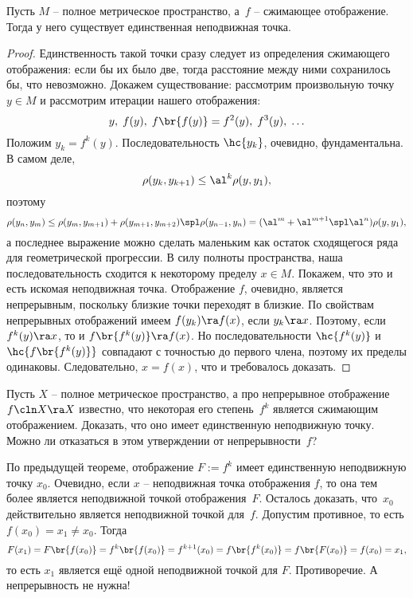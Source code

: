 \documentclass[a4paper]{article}
\begin{document}
\begin{theorem}
Пусть $M$ -- полное метрическое пространство, а~$f$ -- сжимающее отображение.
Тогда у него существует единственная неподвижная точка.
\end{theorem}
\begin{proof}
Единственность такой точки сразу следует из определения сжимающего отображения: если бы их было две,
тогда расстояние между ними сохранилось бы, что невозможно. Докажем существование:
рассмотрим произвольную точку $y \in M$ и рассмотрим итерации нашего отображения:
$$y,\; f(y),\;  f\br{f(y)} = f^2(y),\;  f^3(y),\;  \ldots$$
Положим $y_k = f^k(y)$. Последовательность $\hc{y_k}$, очевидно, фундаментальна. В самом деле,
$$\rho(y_k, y_{k+1}) \le \al^k\rho(y, y_1),$$
поэтому
$$
  \rho(y_n, y_m) \le \rho(y_m, y_{m+1}) + \rho(y_{m+1}, y_{m+2})\spl \rho(y_{n-1}, y_n)=
  (\al^m + \al^{m+1} \spl \al^n)\rho(y,y_1),
$$
а последнее выражение можно сделать маленьким как остаток сходящегося ряда для геометрической прогрессии.
В силу полноты пространства, наша последовательность сходится к некоторому пределу $x \in M$.
Покажем, что это и есть искомая неподвижная точка.
Отображение $f$, очевидно, является непрерывным, поскольку близкие точки переходят в близкие.
По свойствам непрерывных отображений имеем $f(y_k) \ra f(x)$, если $y_k \ra x$. Поэтому,
если $f^k(y) \ra x$, то и $f\br{f^k(y)} \ra f(x)$. Но последовательности
$\hc{f^k(y)}$ и $\hc{f\br{f^k(y)}}$ совпадают с точностью до первого члена, поэтому их пределы
одинаковы. Следовательно, $x = f(x)$, что и требовалось доказать.
\end{proof}

\begin{problem}
Пусть $X$ -- полное метрическое пространство, а про непрерывное отображение $f\cln X \ra X$ известно,
что некоторая его степень~$f^k$ является сжимающим отображением. Доказать, что оно имеет
единственную неподвижную точку. Можно ли отказаться в этом утверждении от непрерывности~$f$?
\end{problem}
\begin{solution}
По предыдущей теореме, отображение $F := f^k$ имеет единственную неподвижную точку $x_0$.
Очевидно, если $x$ -- неподвижная точка отображения $f$, то она тем более является неподвижной
точкой отображения~$F$. Осталось доказать, что~$x_0$ действительно является неподвижной точкой
для~$f$. Допустим противное, то есть $f(x_0) = x_1 \neq x_0$. Тогда
$$F(x_1) = F\br{f(x_0)} = f^k\br{f(x_0)} = f^{k+1}(x_0) = f\br{f^k(x_0)} = f\br{F(x_0)} = f(x_0) = x_1,$$
то есть $x_1$ является ещё одной неподвижной точкой для $F$. Противоречие. А непрерывность не нужна!
\end{solution}
\end{document}

